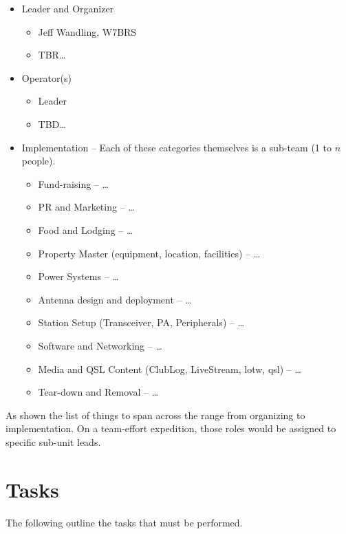 \documentclass[11pt]{article}
\begin{document}
\begin{itemize}
\item Leader and Organizer
   \begin{itemize}
      \item Jeff Wandling, W7BRS
      \item TBR\ldots
   \end{itemize}
\item Operator(s)
    \begin{itemize}
      \item Leader
      \item TBD\ldots
    \end{itemize}
\item Implementation -- Each of these categories themselves is a sub-team (1 to $n$ people).
     \begin{itemize}
         \item Fund-raising --  \ldots
         \item PR and Marketing --  \ldots
         \item Food and Lodging --  \ldots
         \item Property Master (equipment, location, facilities) --  \ldots
         \item Power Systems --  \ldots
         \item Antenna design and deployment --  \ldots
         \item Station Setup (Transceiver, PA, Peripherals) --  \ldots
         \item Software and Networking --  \ldots
         \item Media and QSL Content (ClubLog, LiveStream, {\gls{lotw}},
 {\gls{qsl}}) --  \ldots
         \item Tear-down and Removal --  \ldots
     \end{itemize}
 \end{itemize}

As shown the list of things to span across the range
from organizing to implementation.  On a team-effort expedition,
those roles would be assigned to specific sub-unit leads.
\section{Tasks}

The following outline the tasks that must be performed.
\end{document}
